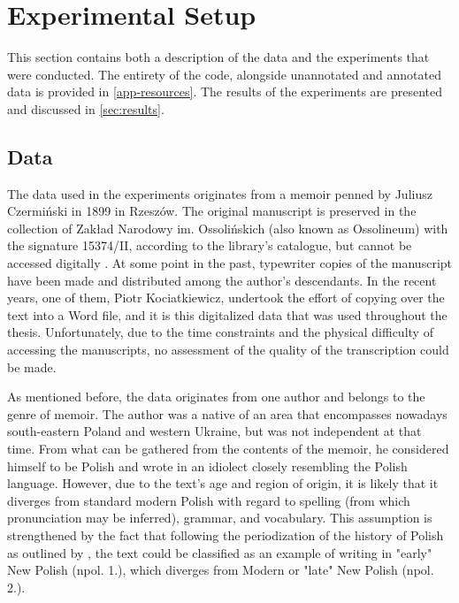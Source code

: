 \section{Experimental Setup}
\label{sec:exp-setup}

This section contains both a description of the data and the experiments that were conducted. The entirety of the code, alongside unannotated and annotated data is provided in \autoref{app-resources}. The results of the experiments are presented and discussed in \autoref{sec:results}.

\subsection{Data}
\label{subsec:data}

The data used in the experiments originates from a memoir penned by Juliusz Czermiński in 1899 in Rzeszów. The original manuscript is preserved in the collection of Zakład Narodowy im. Ossolińskich (also known as Ossolineum) with the signature 15374/II, according to the library's catalogue, but cannot be accessed digitally \citep{ossolineum}. At some point in the past, typewriter copies of the manuscript have been made and distributed among the author's descendants. In the recent years, one of them, Piotr Kociat\-kiewicz, undertook the effort of copying over the text into a Word file, and it is this digitalized data that was used throughout the thesis. Unfortunately, due to the time constraints and the physical difficulty of accessing the manuscripts, no assessment of the quality of the transcription could be made.

As mentioned before, the data originates from one author and belongs to the genre of memoir. The author was a native of an area that encompasses nowadays south-eastern Poland and western Ukraine, but was not independent at that time. From what can be gathered from the contents of the memoir, he considered himself to be Polish and wrote in an idiolect closely resembling the Polish language. However, due to the text's age and region of origin, it is likely that it diverges from standard modern Polish with regard to spelling (from which pronunciation may be inferred), grammar, and vocabulary. This assumption is strengthened by the fact that following the periodization of the history of Polish as outlined by \citet{długosz-kurczabowa_dubisz_2006}, the text could be classified as an example of writing in "early" New Polish (npol. 1.), which diverges from Modern or "late" New Polish (npol. 2.).

